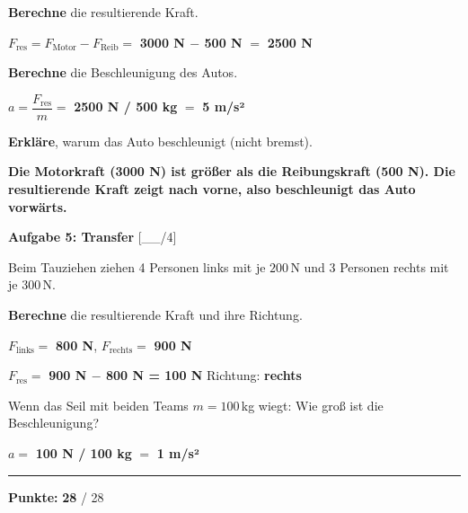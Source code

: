 \documentclass[11pt, a4paper]{article}
\newcommand{\maxpunkte}{28}
\newcommand{\lsg}[1]{\textcolor{loesung}{\textbf{#1}}}
\newcommand{\punktebox}[1]{\hfill\small\textcolor{mittelgrau}{[\_\_/#1]}}
\newcommand{\aufgabe}[1]{%
    \needspace{4\baselineskip}%
    \vspace{10pt}%
    \noindent\textbf{\textcolor{fachfarbe}{Aufgabe #1}}%
    \vspace{4pt}%
    \nopagebreak[4]%
}
\newcommand{\operator}[1]{\textbf{\textcolor{fachfarbe}{#1}}}
\begin{document}
\begin{teil}
    \item \operator{Berechne} die resultierende Kraft.

    \vspace{0.3em}
    $F_{\text{res}} = F_{\text{Motor}} - F_{\text{Reib}} = $ \lsg{3000 N $-$ 500 N} $= $ \lsg{2500 N}

    \item \operator{Berechne} die Beschleunigung des Autos.

    \vspace{0.3em}
    $a = \dfrac{F_{\text{res}}}{m} = $ \lsg{2500 N / 500 kg} $= $ \lsg{5 m/s²}

    \item \operator{Erkläre}, warum das Auto beschleunigt (nicht bremst).

    \lsg{Die Motorkraft (3000 N) ist größer als die Reibungskraft (500 N). Die resultierende Kraft zeigt nach vorne, also beschleunigt das Auto vorwärts.}
\end{teil}


\aufgabe{5: Transfer} \punktebox{4}

Beim Tauziehen ziehen 4 Personen links mit je $200\,$N und 3 Personen rechts mit je $300\,$N.

\begin{teil}
    \item \operator{Berechne} die resultierende Kraft und ihre Richtung.

    \vspace{0.3em}
    $F_{\text{links}} = $ \lsg{800 N}, \quad $F_{\text{rechts}} = $ \lsg{900 N}

    \vspace{0.3em}
    $F_{\text{res}} = $ \lsg{900 N $-$ 800 N = 100 N} Richtung: \lsg{rechts}

    \item Wenn das Seil mit beiden Teams $m = 100\,$kg wiegt: Wie groß ist die Beschleunigung?

    \vspace{0.3em}
    $a = $ \lsg{100 N / 100 kg} $= $ \lsg{1 m/s²}
\end{teil}


\vfill
\hrule
\vspace{0.4em}

\hfill\textbf{Punkte:} \lsg{28} / \maxpunkte
\end{document}
